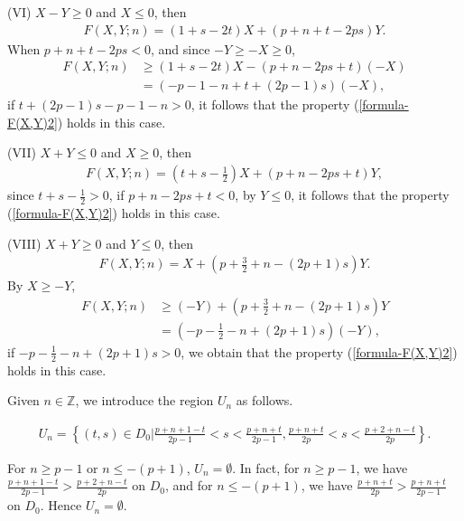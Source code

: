 \documentclass[12pt]{amsart}
\begin{document}
(VI) $X-Y\geq 0$ and $X\leq 0$, then 
\begin{align}
     F(X,Y;n)=\left(1+s-2t\right)X+\left(p+n+t-2ps\right)Y.
\end{align}
When $p+n+t-2ps<0$, and since $-Y\geq -X\geq 0$,  
 \begin{align}
     F(X,Y;n)&\geq \left(1+s-2t\right)X-\left(p+n-2ps+t\right)(-X)\\\nonumber
    &=(-p-1-n+t+(2p-1)s)(-X),
\end{align}
if $t+(2p-1)s-p-1-n>0$, it follows that the property (\ref{formula-F(X,Y)2}) holds in this case. 



(VII) $X+Y\leq 0$ and $X\geq 0$, then 
   \begin{align}
    F(X,Y;n)=\left(t+s-\frac{1}{2}\right)X+\left(p+n-2ps+t\right)Y,
\end{align}
since $t+s-\frac{1}{2}>0$, if $p+n-2ps+t< 0$, by $Y\leq 0$,   
it follows that the property (\ref{formula-F(X,Y)2}) holds in this case. 




(VIII) $X+Y\geq 0$ and $Y\leq 0$, then 
   \begin{align}
     F(X,Y;n)=X+\left(p+\frac{3}{2}+n-(2p+1)s\right)Y.
\end{align}
By $X\geq -Y$,
   \begin{align}
     F(X,Y;n)&\geq (-Y)+\left(p+\frac{3}{2}+n-(2p+1)s\right)Y\\\nonumber
    &=\left(-p-\frac{1}{2}-n+(2p+1)s\right)(-Y),
\end{align}
if $-p-\frac{1}{2}-n+(2p+1)s>0$, we obtain that the property (\ref{formula-F(X,Y)2}) holds in this case.

Given $n\in \mathbb{Z}$, we introduce the region $U_n$ as follows.
\begin{small}
    \begin{align}
    U_n=\left\{(t,s)\in D_0\bigg|\frac{p+n+1-t}{2p-1}<s<\frac{p+n+t}{2p-1}, \frac{p+n+t}{2p}<s<\frac{p+2+n-t}{2p}\right\}.
\end{align}
\end{small}
\begin{remark} \label{remark-Un}
   For $n\geq p-1$ or $n\leq -(p+1)$, $U_n=\emptyset$. In fact, for $n\geq p-1$, we have 
       $\frac{p+n+1-t}{2p-1}>\frac{p+2+n-t}{2p}$ on $D_0$, and for $n\leq -(p+1)$, we have 
        $\frac{p+n+t}{2p}>\frac{p+n+t}{2p-1}$ on $D_0$. Hence $U_n=\emptyset$.  
\end{remark}
\end{document}
